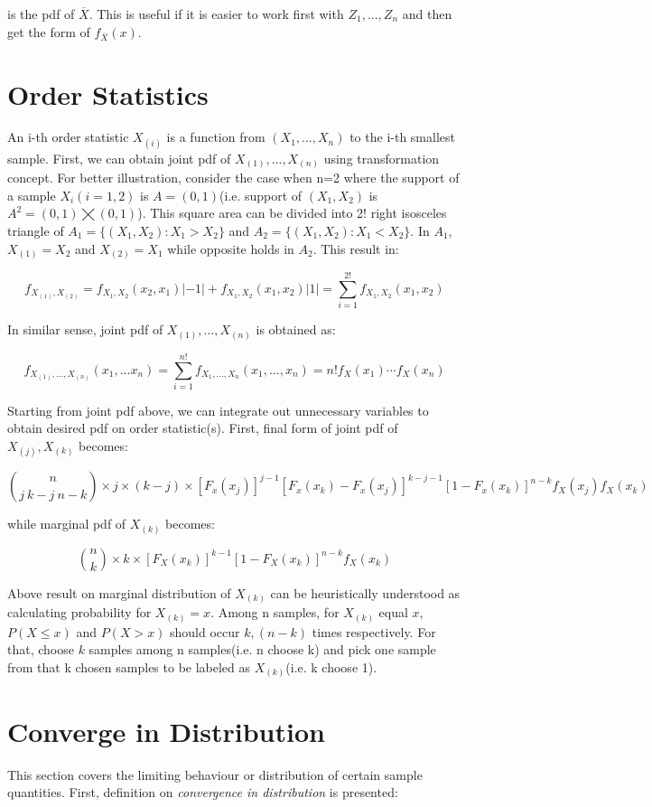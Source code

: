 \documentclass[10pt]{article}
\begin{document}
\noindent is the pdf of $\overline{X}$. This is useful if it is easier to work first with $Z_1,...,Z_n$ and then get the form of $f_{\overline{X}}(x)$.

\section{Order Statistics}
An i-th order statistic $X_{(i)}$ is a function from $(X_1,...,X_n)$ to the i-th smallest sample. First, we can obtain joint pdf of $X_{(1)},...,X_{(n)}$ using transformation concept. For better illustration, consider the case when n=2 where the support of a sample $X_i(i=1,2)$ is $A=(0,1)$(i.e. support of $(X_1, X_2)$ is $A^2=(0,1)\bigtimes (0,1)$). This square area can be divided into 2! right isosceles triangle of $A_1=\{(X_1, X_2):X_1>X_2\}$ and $A_2=\{(X_1, X_2):X_1<X_2\}$. In $A_1$, $X_{(1)}=X_2$ and $X_{(2)}=X_1$ while opposite holds in $A_2$. This result in:

$$
f_{X_{(1)}, X_{(2)}}=f_{X_1, X_2}(x_2,x_1)|-1|+f_{X_1, X_2}(x_1,x_2)|1|=\displaystyle \sum_{i=1}^{2!}f_{X_1, X_2}(x_1,x_2)
$$

\noindent In similar sense, joint pdf of $X_{(1)},...,X_{(n)}$ is obtained as:

$$
f_{X_{(1)},...,X_{(n)}}(x_1,...x_n)=\displaystyle \sum_{i=1}^{n!}f_{X_1,...,X_n}(x_1,...,x_n)=n!f_X(x_1)\cdots f_X(x_n)
$$

\noindent Starting from joint pdf above, we can integrate out unnecessary variables to obtain desired pdf on order statistic(s). First, final form of joint pdf of $X_{(j)}, X_{(k)}$ becomes:

$$
{n\choose j\ k-j\ n-k}\times j\times (k-j)\times [F_x(x_j)]^{j-1}[F_x(x_k)-F_x(x_j)]^{k-j-1}[1-F_x(x_k)]^{n-k}f_X(x_j)f_X(x_k)
$$

\noindent while marginal pdf of $X_{(k)}$ becomes:

$$
{n \choose k}\times k\times[F_X(x_k)]^{k-1}[1-F_X(x_k)]^{n-k}f_X(x_k)
$$

\noindent Above result on marginal distribution of $X_{(k)}$ can be heuristically understood as calculating probability for $X_{(k)}=x$. Among n samples, for $X_{(k)}$ equal $x$, $P(X \leq x)$ and $P(X > x)$ should occur $k, (n-k)$ times respectively. For that, choose $k$ samples among n samples(i.e. n choose k) and pick one sample from that k chosen samples to be labeled as $X_{(k)}$(i.e. k choose 1).

\section{Converge in Distribution}
This section covers the limiting behaviour or distribution of certain sample quantities. First, definition on \textit{convergence in distribution} is presented:\bigskip
\end{document}
